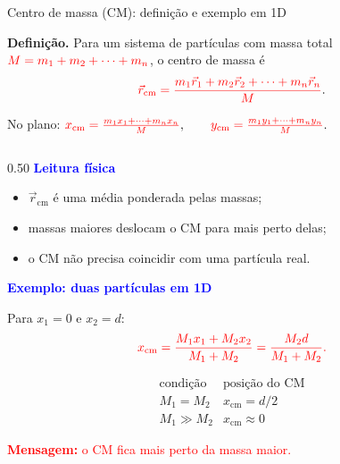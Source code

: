 \documentclass{beamer}
\begin{document}
	
	\begin{frame}{Centro de massa (CM): definição e exemplo em 1D}
		\tiny
		
		\textbf{Definição.} Para um sistema de partículas com massa total
		\(\textcolor{red}{M=m_1+m_2+\cdots+m_n}\), o centro de massa é
		\[
		\textcolor{red}{
			\vec r_{\text{cm}}=
			\frac{m_1\vec r_1+m_2\vec r_2+\cdots+m_n\vec r_n}{M}}.
		\]
		
		No plano:
		$
		\textcolor{red}{
			x_{\text{cm}}=\frac{m_1x_1+\cdots+m_nx_n}{M}},
		\qquad
		\textcolor{red}{
			y_{\text{cm}}=\frac{m_1y_1+\cdots+m_ny_n}{M}}.
		$
		
		\vspace{0.3cm}
		
		\begin{columns}[T]
			\begin{column}{0.50\textwidth}
				\textcolor{blue}{\textbf{Leitura física}}
				\begin{itemize}
					\item \(\vec r_{\text{cm}}\) é uma média ponderada pelas massas;
					\item massas maiores deslocam o CM para mais perto delas;
					\item o CM não precisa coincidir com uma partícula real.
				\end{itemize}
				
				\vspace{0.05cm}
				
				\textcolor{blue}{\textbf{Exemplo: duas partículas em 1D}}
				
				\vspace{0.3cm}
				
				Para \(x_1=0\) e \(x_2=d\):
				\[
				\textcolor{red}{
					x_{\text{cm}}=
					\frac{M_1x_1+M_2x_2}{M_1+M_2}
					=
					\frac{M_2d}{M_1+M_2}.}
				\]
				
				\vspace{-0.2cm}
				
				\[
				\begin{array}{c|c}
					\text{condição} & \text{posição do CM} \\ \hline
					M_1=M_2 & x_{\text{cm}}=d/2 \\[1pt]
					M_1\gg M_2 & x_{\text{cm}}\approx 0
				\end{array}
				\]
				
				\textcolor{red}{\textbf{Mensagem:} o CM fica mais perto da massa maior.}
			\end{column}
			

\end{columns}
\end{frame}
\end{document}
